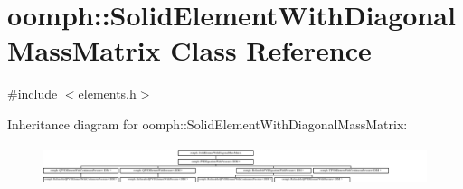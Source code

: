 \hypertarget{classoomph_1_1SolidElementWithDiagonalMassMatrix}{}\section{oomph\+:\+:Solid\+Element\+With\+Diagonal\+Mass\+Matrix Class Reference}
\label{classoomph_1_1SolidElementWithDiagonalMassMatrix}


{\ttfamily \#include $<$elements.\+h$>$}

Inheritance diagram for oomph\+:\+:Solid\+Element\+With\+Diagonal\+Mass\+Matrix\+:\begin{figure}[H]
\begin{center}
\leavevmode
\includegraphics[height=1.154639cm]{classoomph_1_1SolidElementWithDiagonalMassMatrix}
\end{center}
\end{figure}

